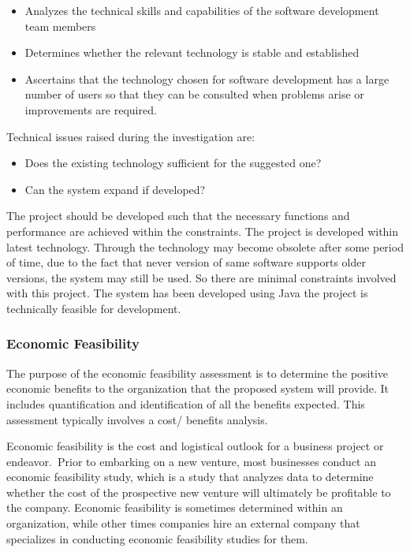 \begin{itemize}
	\item Analyzes the technical skills and capabilities of the software development team members
	\item Determines whether the relevant technology is stable and established
	\item Ascertains that the technology chosen for software development has a large number of users so that they can be consulted when problems arise or improvements are required.
\end{itemize}

Technical issues raised during the investigation are:
\begin{itemize}
	\item Does the existing technology sufficient for the suggested one?
	\item Can the system expand if developed?
\end{itemize}

The project should be developed such that the necessary functions and performance are achieved within the constraints. The project is developed within latest technology. Through the technology may become obsolete after some period of time, due to the fact that never version of same software supports older versions, the system may still be used. So there are minimal constraints involved with this project. The system has been developed using Java the project is technically feasible for development.

\subsubsection{Economic Feasibility}
The purpose of the economic feasibility assessment is to determine the positive economic benefits to the organization that the proposed system will provide. It includes quantification and identification of all the benefits expected. This assessment typically involves a cost/ benefits analysis.

Economic feasibility is the cost and logistical outlook for a business project or endeavor. Prior to embarking on a new venture, most businesses conduct an economic feasibility study, which is a study that analyzes data to determine whether the cost of the prospective new venture will ultimately be profitable to the company. Economic feasibility is sometimes determined within an organization, while other times companies hire an external company that specializes in conducting economic feasibility studies for them.

